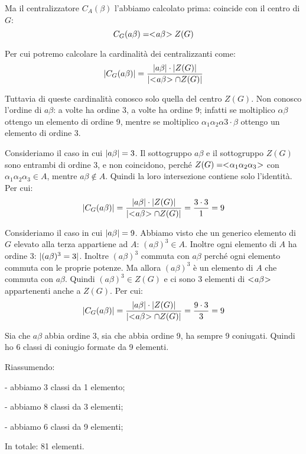 \begin{soluzione}
    Ma il centralizzatore $C_A(\beta)$ l'abbiamo calcolato prima: coincide con il centro di $G$:
    \begin{equation*}
        C_G(a\beta) = < \negmedspace a\beta \negmedspace > Z(G)
    \end{equation*}

    Per cui potremo calcolare la cardinalità dei centralizzanti come:
    \begin{equation*}
        \lvert C_G(a\beta) \rvert = \dfrac{\lvert a\beta \rvert \cdot \lvert Z(G) \rvert}{\lvert < \negmedspace a\beta \negmedspace > \cap Z(G) \rvert}
    \end{equation*}

    Tuttavia di queste cardinalità conosco solo quella del centro $Z(G)$.
    Non conosco l'ordine di $a\beta$: a volte ha ordine 3, a volte ha ordine 9;
    infatti se moltiplico $\alpha\beta$ ottengo un elemento di ordine 9, mentre se moltiplico
    $\alpha_1\alpha_2\alpha3 \cdot \beta$ ottengo un elemento di ordine 3.

    Consideriamo il caso in cui $\lvert a\beta \rvert = 3$.
    Il sottogruppo $a\beta$ e il sottogruppo $Z(G)$ sono entrambi di ordine 3, e non coincidono,
    perché $Z(G) = < \negmedspace \alpha_1\alpha_2\alpha_3 \negmedspace >$ con $\alpha_1\alpha_2\alpha_3 \in A$, mentre $a\beta \not\in A$.
    Quindi la loro intersezione contiene solo l'identità.
    Per cui:
    \begin{equation*}
        \lvert C_G(a\beta) \rvert = \dfrac{\lvert a\beta \rvert \cdot \lvert Z(G) \rvert}{\lvert < \negmedspace a\beta \negmedspace > \cap Z(G) \rvert} =
        \dfrac{3 \cdot 3}{1} = 9
    \end{equation*}

    Consideriamo il caso in cui $\lvert a\beta \rvert = 9$.
    Abbiamo visto che un generico elemento di $G$ elevato alla terza appartiene ad $A$: $(a\beta)^3 \in A$.
    Inoltre ogni elemento di $A$ ha ordine 3: $\lvert (a\beta)^3 = 3 \rvert$.
    Inoltre $(a\beta)^3$ commuta con $a\beta$ perché ogni elemento commuta con le proprie potenze.
    Ma allora $(a\beta)^3$ è un elemento di $A$ che commuta con $a\beta$.
    Quindi $(a\beta)^3 \in Z(G)$ e ci sono 3 elementi di $< \negmedspace a\beta \negmedspace >$ appartenenti anche a $Z(G)$.
    Per cui:
    \begin{equation*}
        \lvert C_G(a\beta) \rvert = \dfrac{\lvert a\beta \rvert \cdot \lvert Z(G) \rvert}{\lvert < \negmedspace a\beta \negmedspace > \cap Z(G) \rvert} =
        \dfrac{9 \cdot 3}{3} = 9
    \end{equation*}

    Sia che $a\beta$ abbia ordine 3, sia che abbia ordine 9, ha sempre 9 coniugati.
    Quindi ho 6 classi di coniugio formate da 9 elementi.

    Riassumendo:

    - abbiamo 3 classi da 1 elemento;

    - abbiamo 8 classi da 3 elementi;

    - abbiamo 6 classi da 9 elementi;

    In totale: 81 elementi.
\end{soluzione}

